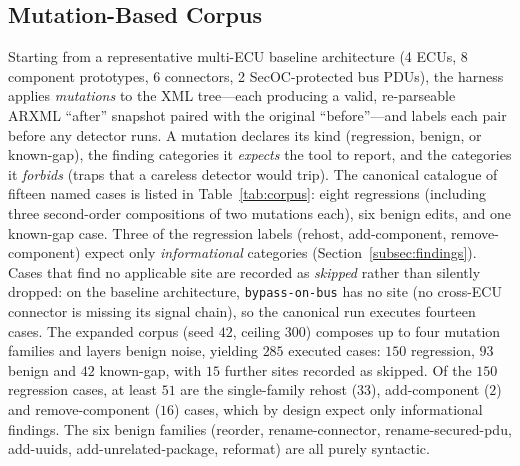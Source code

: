 \documentclass[journal]{IEEEtran}
\begin{document}
\subsection{Mutation-Based Corpus}
Starting from a representative multi-ECU baseline architecture (4 ECUs, 8
component prototypes, 6 connectors, 2 SecOC-protected bus PDUs), the harness
applies \emph{mutations} to the XML tree---each producing a valid, re-parseable
ARXML ``after'' snapshot paired with the original ``before''---and labels each
pair before any detector runs. A mutation declares its kind (regression,
benign, or known-gap), the finding categories it \emph{expects} the tool to
report, and the categories it \emph{forbids} (traps that a careless detector
would trip). The canonical catalogue of fifteen named cases is listed in
Table~\ref{tab:corpus}: eight regressions (including three second-order
compositions of two mutations each), six benign edits, and one known-gap case.
Three of the regression labels (rehost, add-component, remove-component) expect
only \emph{informational} categories (Section~\ref{subsec:findings}). Cases that
find no applicable site are recorded as \emph{skipped} rather than silently
dropped: on the baseline architecture, \texttt{bypass-on-bus} has no site (no cross-ECU
connector is missing its signal chain), so the canonical run executes fourteen
cases. The expanded corpus (seed $42$, ceiling $300$) composes up to four
mutation families and layers benign noise, yielding $285$ executed cases: $150$
regression, $93$ benign and $42$ known-gap, with $15$ further sites recorded as
skipped. Of the $150$ regression cases, at least $51$ are the single-family
rehost ($33$), add-component ($2$) and remove-component ($16$) cases, which by
design expect only informational findings. The six benign families (reorder,
rename-connector, rename-secured-pdu, add-uuids, add-unrelated-package,
reformat) are all purely syntactic.
\end{document}
